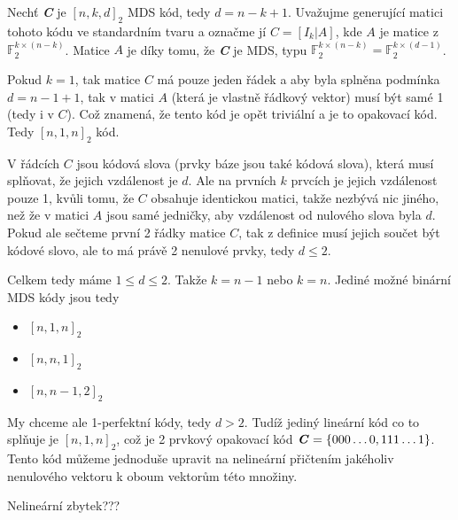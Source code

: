 \documentclass[12pt, a4paper]{article}
\begin{document}
\section{}
Nechť \textbf{\textit{C}} je $[n,k,d]_{2}$ MDS kód, tedy $d=n-k+1$. Uvažujme generující matici tohoto kódu ve standardním tvaru a označme jí $C = [I_{k}|A]$, kde $A$ je matice z $\mathbb{F}^{k \times (n-k)}_{2}$. Matice $A$ je díky tomu, že \textbf{\textit{C}} je MDS, typu $\mathbb{F}^{k \times (n-k)}_{2} = \mathbb{F}^{k \times (d-1)}_{2}$.



Pokud $k=1$, tak matice $C$ má pouze jeden řádek a aby byla splněna podmínka $d = n - 1 + 1$, tak v matici $A$ (která je vlastně řádkový vektor) musí být samé 1 (tedy i v $C$). Což znamená, že tento kód je opět triviální a je to opakovací kód. Tedy $[n,1,n]_{2}$ kód.

 V řádcích $C$ jsou kódová slova (prvky báze jsou také kódová slova), která musí splňovat, že jejich vzdálenost je $d$. Ale na prvních $k$ prvcích je jejich vzdálenost pouze 1, kvůli tomu, že $C$ obsahuje identickou matici, takže nezbývá nic jiného, než že v matici $A$ jsou samé jedničky, aby vzdálenost od nulového slova byla $d$. Pokud ale sečteme první 2 řádky matice $C$, tak z definice musí jejich součet být kódové slovo, ale to má právě 2 nenulové prvky, tedy $d \leq 2$.

Celkem tedy máme $1 \leq d \leq 2$. Takže $k = n-1$ nebo $k = n$. Jediné možné binární MDS kódy jsou tedy
\begin{itemize}
    \item $[n,1,n]_{2}$
    \item $[n,n,1]_{2}$
    \item $[n,n-1,2]_{2}$
\end{itemize}

My chceme ale 1-perfektní kódy, tedy $d > 2$. Tudíž jediný lineární kód co to splňuje je $[n,1,n]_{2}$, což je 2 prvkový opakovací kód $\textbf{\textit{C}}=\{000\dots0, 111\dots1\}$. Tento kód můžeme jednoduše upravit na nelineární přičtením jakéholiv nenulového vektoru k oboum vektorům této množiny.

Nelineární zbytek???
\end{document}

